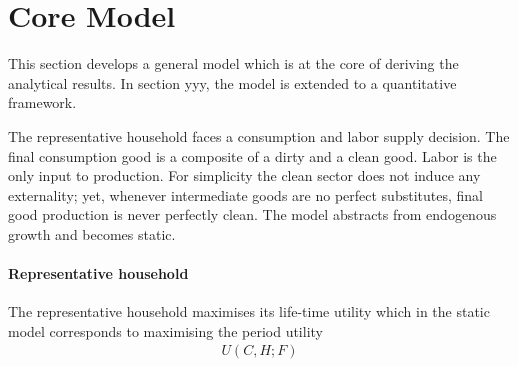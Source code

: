 \section{Core Model}\label{sec:mod_an}

This section develops a general model which is at the core of deriving the analytical results. In section yyy, the model is extended to a quantitative framework. %

The representative household faces a consumption and labor supply decision. The final consumption good is a composite of a dirty and a clean good. Labor is the only input to production. For simplicity the clean sector does not induce any externality; yet, whenever intermediate goods are no perfect substitutes, final good production is never perfectly clean. The model abstracts from endogenous growth and becomes static. 

\paragraph{Representative household}
The representative household maximises its life-time utility which in the static model corresponds to maximising the period utility
\begin{align}
U(C,H; F)
\end{align} 


